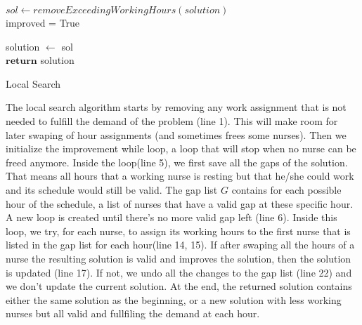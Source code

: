 \begin{algorithm}[H]


$sol \leftarrow removeExceedingWorkingHours(solution)$ \\
improved = True \\


solution $\leftarrow$ sol\\
$\textbf{return}$ solution
\caption{Local Search}\label{alg.mainLoop}
\end{algorithm}

The local search algorithm starts by removing any work assignment that is not needed to fulfill the demand of the problem (line 1). This will make room for later swaping of hour assignments (and sometimes frees some nurses). Then we initialize the improvement while loop, a loop that will stop when no nurse can be freed anymore. Inside the loop(line 5), we first save all the gaps of the solution. That means all hours that a working nurse is resting but that he/she could work and its schedule would still be valid. The gap list $G$ contains for each possible hour of the schedule, a list of nurses that have a valid gap at these specific hour. A new loop is created until there's no more valid gap left (line 6). Inside this loop, we try, for each nurse, to assign its working hours to the first nurse that is listed in the gap list for each hour(line 14, 15).  
If after swaping all the hours of a nurse the resulting solution is valid and improves the solution, then the solution is updated (line 17). If not, we undo all the changes to the gap list (line 22) and we don't update the current solution. At the end, the returned solution contains either the same solution as the beginning, or a new solution with less working nurses but all valid and fullfiling the demand at each hour.

